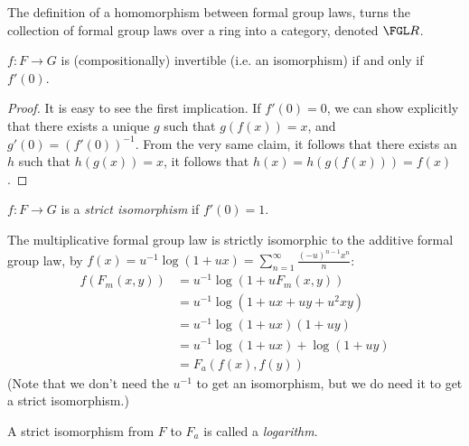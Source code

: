 \begin{definition*}
	The definition of a homomorphism between formal group laws, turns the collection of formal group laws over a ring into a category, denoted $\FGL R$.
\end{definition*}


\begin{claim*}
	$f: F \to G$ is (compositionally) invertible (i.e. an isomorphism) if and only if $f'\left(0\right)$.
\end{claim*}

\begin{proof}
	It is easy to see the first implication.
	If $f'\left(0\right) = 0$, we can show explicitly that there exists a unique $g$ such that $g\left(f\left(x\right)\right) = x$, and $g'\left(0\right) = \left(f'\left(0\right)\right)^{-1}$. From the very same claim, it follows that there exists an $h$ such that $h\left(g\left(x\right)\right) = x$, it follows that $h\left(x\right) = h\left(g\left(f\left(x\right)\right)\right) = f\left(x\right)$.
\end{proof}

\begin{definition*}
	$f: F \to G$ is a \emph{strict isomorphism} if $f'\left(0\right)=1$.
\end{definition*}

\begin{example*}
	The multiplicative formal group law is strictly isomorphic to the additive formal group law,
	by $f\left(x\right) = u^{-1} \log \left(1+ux\right) = \sum_{n=1}^{\infty} \frac{\left(-u\right)^{n-1} x^n}{n}$:
	\begin{align*}
		f\left(F_m\left(x,y\right)\right)
		&= u^{-1} \log \left(1+u F_m\left(x,y\right)\right)\\
		&= u^{-1} \log \left(1+ux+uy+u^2 xy\right)\\
		&= u^{-1} \log \left(1+ux\right)\left(1+uy\right)\\
		&= u^{-1} \log \left(1+ux\right) + \log \left(1+uy\right)\\
		&= F_a\left(f\left(x\right), f\left(y\right)\right)
	\end{align*}
	(Note that we don't need the $u^{-1}$ to get an isomorphism, but we do need it to get a strict isomorphism.)
\end{example*}

\begin{definition*}
	A strict isomorphism from $F$ to $F_a$ is called a \emph{logarithm}.
\end{definition*}